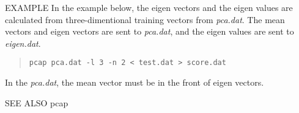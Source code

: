 \begin{options}
\end{options}

\begin{qsection}{EXAMPLE}
 In the example below,
 the eigen vectors and the eigen values are
 calculated from three-dimentional training vectors
 from {\em pca.dat}.
 The mean vectors and eigen vectors are sent to
 {\em pca.dat}, and the eigen values are sent to {\em eigen.dat}.
\begin{quote}
  \verb!pcap pca.dat -l 3 -n 2 < test.dat > score.dat!
\end{quote} 
\end{qsection}
In the {\em pca.dat}, the mean vector must be in the front of
eigen vectors.
\begin{qsection}{SEE ALSO}
 pcap
\end{qsection}
